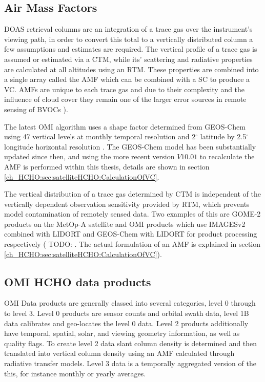   
  \subsection{Air Mass Factors}
    \label{ch_HCHO:sec:satelliteHCHO:AMFs}
    DOAS retrieval columns are an integration of a trace gas over the instrument's viewing path, in order to convert this total to a vertically distributed column a few assumptions and estimates are required. 
    The vertical profile of a trace gas is assumed or estimated via a CTM, while its' scattering and radiative properties are calculated at all altitudes using an RTM. 
    These properties are combined into a single array called the AMF which can be combined with a SC to produce a VC.
    AMFs are unique to each trace gas and due to their complexity and the influence of cloud cover they remain one of the larger error sources in remote sensing of BVOCs \citep{Palmer2001,Millet2006}).
    
    The latest OMI algorithm uses a shape factor determined from GEOS-Chem using 47 vertical levels at monthly temporal resolution and 2$^{\circ}$ latitude by 2.5$^{\circ}$ longitude horizontal resolution \citep{Abad2015}.
    The GEOS-Chem model has been substantially updated since then, and using the more recent version $V10.01$ to recalculate the AMF is performed within this thesis, details are shown in section \ref{ch_HCHO:sec:satelliteHCHO:CalculationOfVC}.
    
    The vertical distribution of a trace gas determined by CTM is independent of the vertically dependent observation sensitivity provided by RTM, which prevents model contamination of remotely sensed data.
    Two examples of this are GOME-2 products on the MetOp-A satellite and OMI products which use IMAGESv2 combined with LIDORT and GEOS-Chem with LIDORT for product processing respectively ( TODO: %
    \citep{Abad2015}.
    The actual formulation of an AMF is explained in section \ref{ch_HCHO:sec:satelliteHCHO:CalculationOfVC}).
  
  \subsection{OMI HCHO data products}
    OMI Data products are generally classed into several categories, level 0 through to level 3. Level 0 products are sensor counts and orbital swath data, level 1B data calibrates and geo-locates the level 0 data. Level 2 products additionally have temporal, spatial, solar, and viewing geometry information, as well as quality flags.
    To create level 2 data slant column density is determined and then translated into vertical column density using an AMF calculated through radiative transfer models. Level 3 data is a temporally aggregated version of the this, for instance monthly or yearly averages.
    
